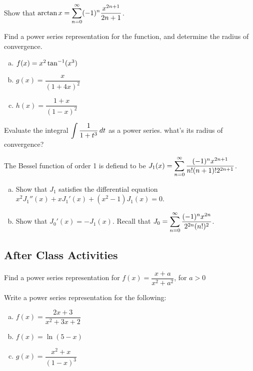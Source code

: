 \documentclass[notes]{subfiles}
\begin{document}
		\begin{ex}
			Show that $\arctan x = \displaystyle \sum_{n=0}^\infty (-1)^n \dfrac{x^{2n+1}}{2n+1}$.
		\end{ex}
			\newpage
			
		\begin{ex}
			Find a power series representation for the function, and determine the radius of convergence.
			\begin{enumerate}[(a)]
				\item $f(x) = x^2 \tan^{-1}(x^3)$
					
				\item $g(x) = \dfrac{x}{(1+4x)^2}$
				
				\item $h(x) = \dfrac{1+x}{(1-x)^2}$
			\end{enumerate}
		\end{ex}
			\newpage
			
		\begin{ex}
			Evaluate the integral $\displaystyle \int \dfrac{1}{1+t^3}\, dt$ as a power series.  what's its radius of convergence?
		\end{ex}
			\vs{1}
			
		\begin{ex}
			The Bessel function of order 1 is defiend to be $J_1(x) = \displaystyle \sum_{n=0}^\infty \dfrac{(-1)^nx^{2n+1}}{n!(n+1)!2^{2n+1}}$.
			\begin{enumerate}[(a)]
				\item Show that $J_1$ satisfies the differential equation $x^2J_1''(x) + xJ_1'(x) + (x^2-1)J_1(x) = 0$.
					\vs{2}
					
				\item Show that $J_0'(x) = -J_1(x)$.  Recall that $J_0 = \displaystyle \sum_{n=0}^\infty \dfrac{(-1)^nx^{2n}}{2^{2n}(n!)^2}$.
					\vs{1}
			\end{enumerate}
		\end{ex}
			\newpage
			
	\subsection*{After Class Activities}
		\begin{ex}
			Find a power series representation for $f(x) = \dfrac{x+a}{x^2 + a^2}$, for $a > 0$	
		\end{ex}
			
		\begin{ex}
			Write a power series representation for the following:
			\begin{enumerate}[(a)]
				\item $f(x) = \dfrac{2x+3}{x^2+3x+2}$
					
				\item $f(x) = \ln (5-x)$
					\vs{1}
					
				\item $g(x) = \dfrac{x^2 + x}{(1-x)^3}$
					\vs{1}
			\end{enumerate}
		\end{ex}
\clearpage
\end{document}
